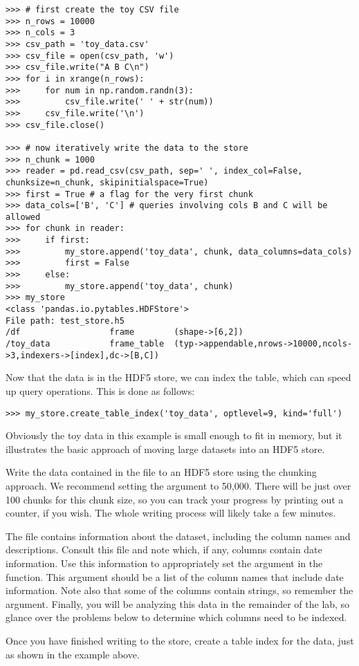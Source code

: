 \begin{lstlisting}
>>> # first create the toy CSV file
>>> n_rows = 10000
>>> n_cols = 3
>>> csv_path = 'toy_data.csv'
>>> csv_file = open(csv_path, 'w')
>>> csv_file.write("A B C\n")
>>> for i in xrange(n_rows):
>>>     for num in np.random.randn(3):
>>>         csv_file.write(' ' + str(num))
>>>     csv_file.write('\n')
>>> csv_file.close()

>>> # now iteratively write the data to the store
>>> n_chunk = 1000
>>> reader = pd.read_csv(csv_path, sep=' ', index_col=False, chunksize=n_chunk, skipinitialspace=True)
>>> first = True # a flag for the very first chunk
>>> data_cols=['B', 'C'] # queries involving cols B and C will be allowed
>>> for chunk in reader:
>>>     if first:
>>>         my_store.append('toy_data', chunk, data_columns=data_cols)
>>>         first = False
>>>     else:
>>>         my_store.append('toy_data', chunk)
>>> my_store
<class 'pandas.io.pytables.HDFStore'>
File path: test_store.h5
/df                  frame        (shape->[6,2])
/toy_data            frame_table  (typ->appendable,nrows->10000,ncols->3,indexers->[index],dc->[B,C])
\end{lstlisting}
Now that the data is in the HDF5 store, we can index the table, which can speed up query operations.
This is done as follows:
\begin{lstlisting}
>>> my_store.create_table_index('toy_data', optlevel=9, kind='full')
\end{lstlisting}
Obviously the toy data in this example is small enough to fit in memory, but it illustrates the basic approach
of moving large datasets into an HDF5 store.

\begin{problem}
Write the data contained in the file  to an HDF5 store using the chunking approach.
We recommend setting the  argument to 50,000. There will be just over 100 chunks for this
chunk size, so you can track your progress by printing out a counter, if you wish. The whole writing
process will likely take a few minutes.

The file  contains information about the dataset, including the column names and descriptions.
Consult this file and note which, if any, columns contain date information. Use this information to appropriately
set the  argument in the  function. This argument should be a list of the column names
that include date information. Note also that some of the columns contain strings, so remember the 
 argument. Finally, you will be analyzing this data in the remainder of the lab, so glance over 
the problems below to determine which columns need to be indexed. 

Once you have finished writing to the store, create a table index for the data, just as shown in the example above.
\end{problem}

